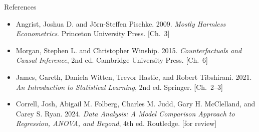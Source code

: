 \documentclass[aspectratio=169,11pt,xcolor=dvipsnames]{beamer}
\begin{document}
\begin{frame}{References}
\footnotesize
\begin{itemize}\itemsep3pt
\item Angrist, Joshua D. and J\"orn-Steffen Pischke. 2009.
\textit{Mostly Harmless Econometrics}. Princeton University Press. [Ch.\ 3]
\item Morgan, Stephen L. and Christopher Winship. 2015.
\textit{Counterfactuals and Causal Inference}, 2nd ed. Cambridge University Press.
[Ch.\ 6]
\item James, Gareth, Daniela Witten, Trevor Hastie, and Robert Tibshirani. 2021.
\textit{An Introduction to Statistical Learning}, 2nd ed. Springer. [Ch.\ 2--3]
\item Correll, Josh, Abigail M. Folberg, Charles M. Judd, Gary H. McClelland, and
Carey S. Ryan. 2024. \textit{Data Analysis: A Model Comparison Approach to
Regression, ANOVA, and Beyond}, 4th ed. Routledge. [for review]
\end{itemize}
\end{frame}
\end{document}
